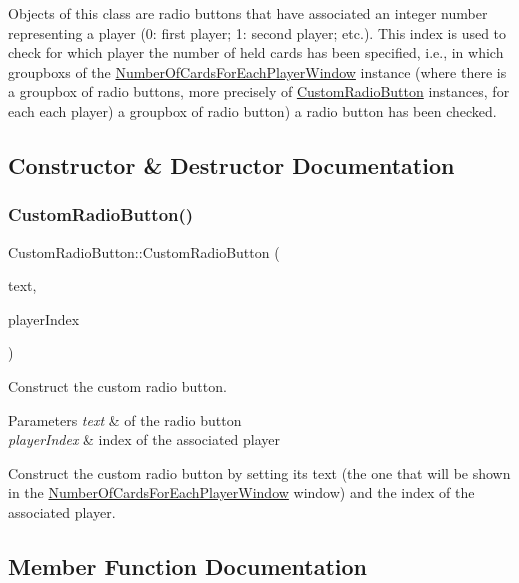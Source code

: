 Objects of this class are radio buttons that have associated an integer number representing a player (0\+: first player; 1\+: second player; etc.). This index is used to check for which player the number of held cards has been specified, i.\+e., in which groupboxs of the \hyperlink{classNumberOfCardsForEachPlayerWindow}{Number\+Of\+Cards\+For\+Each\+Player\+Window} instance (where there is a groupbox of radio buttons, more precisely of \hyperlink{classCustomRadioButton}{Custom\+Radio\+Button} instances, for each each player) a groupbox of radio button) a radio button has been checked. 

\subsection{Constructor \& Destructor Documentation}
\mbox{\label{classCustomRadioButton_a0868507b2cbd667b2788eddc38001bc4}} 
\subsubsection{\texorpdfstring{Custom\+Radio\+Button()}{CustomRadioButton()}}
{\footnotesize\ttfamily Custom\+Radio\+Button\+::\+Custom\+Radio\+Button (\begin{DoxyParamCaption}\item[{Q\+String}]{text,  }\item[{int}]{player\+Index }\end{DoxyParamCaption})}



Construct the custom radio button. 


\begin{DoxyParams}{Parameters}
{\em text} & of the radio button \\
\hline
{\em player\+Index} & index of the associated player\\
\hline
\end{DoxyParams}
Construct the custom radio button by setting its text (the one that will be shown in the \hyperlink{classNumberOfCardsForEachPlayerWindow}{Number\+Of\+Cards\+For\+Each\+Player\+Window} window) and the index of the associated player. 

\subsection{Member Function Documentation}
\mbox{\label{classCustomRadioButton_ad92a16634a48c1cc86cd3848c84accc9}} 

